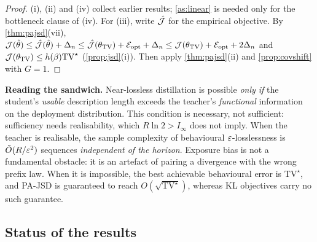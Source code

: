 \begin{proof}
(i), (ii) and (iv) collect earlier results; \cref{as:linear} is needed only for the bottleneck clause of (iv).
For (iii), write $\hat{\mathcal{J}}$ for the empirical objective. By \cref{thm:pajsd}(vii),
$\mathcal{J}(\hat\theta)\le\hat{\mathcal{J}}(\hat\theta)+\Delta_n\le\hat{\mathcal{J}}(\theta_{\mathrm{TV}})+\mathcal{E}_{\mathrm{opt}}+\Delta_n\le\mathcal{J}(\theta_{\mathrm{TV}})+\mathcal{E}_{\mathrm{opt}}+2\Delta_n$ and
$\mathcal{J}(\theta_{\mathrm{TV}})\le h(\beta)\mathrm{TV}^\star$ (\cref{prop:jsd}(i)). Then apply \cref{thm:pajsd}(ii) and
\cref{prop:covshift} with $G=1$.
\end{proof}

\noindent\textbf{Reading the sandwich.} Near-lossless distillation is possible \emph{only if} the student's
\emph{usable} description length exceeds the teacher's \emph{functional} information on the deployment
distribution. This condition is necessary, not sufficient: sufficiency needs realisability, which
$R\ln2>I_\infty$ does not imply. When the teacher is realisable, the sample complexity of behavioural
$\varepsilon$-losslessness is $\tilde O(R/\varepsilon^2)$ sequences \emph{independent of the horizon}. Exposure bias is not a fundamental
obstacle: it is an artefact of pairing a divergence with the wrong prefix law. When it is impossible,
the best achievable behavioural error is $\mathrm{TV}^\star$, and PA-JSD is guaranteed to reach
$O(\sqrt{\mathrm{TV}^\star})$, whereas KL objectives carry no such guarantee.

\subsection{Status of the results}

